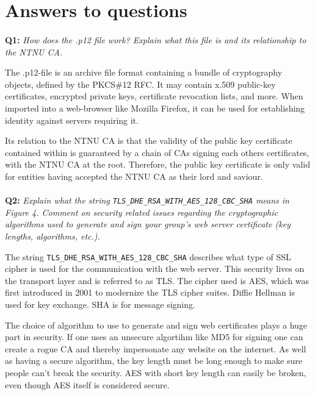 \section{Answers to questions}

\paragraph{}
\textbf{Q1:}
\textit{How does the .p12 file work? Explain what this file is and its relationship to the NTNU CA.}

The .p12-file is an archive file format containing a bundle of cryptography objects, defined by the PKCS\#12 RFC\cite{pkcs-12}.
It may contain x.509 public-key certificates\cite{x509}, encrypted private keys, certificate revocation lists, and more.
When imported into a web-browser like Mozilla Firefox, it can be used for establishing identity against servers requiring it.

Its relation to the NTNU CA is that the validity of the public key certificate contained within is guaranteed by a chain of CAs signing each others certificates, with the NTNU CA at the root.
Therefore, the public key certificate is only valid for entities having accepted the NTNU CA as their lord and saviour.

\paragraph{}
\textbf{Q2:}
\cprotect\textit{Explain what the string \verb/TLS_DHE_RSA_WITH_AES_128_CBC_SHA/ means in Figure 4. Comment on security related issues regarding the cryptographic algorithms used to generate and sign your group's web server certificate (key lengths, algorithms, etc.).}

The string \verb/TLS_DHE_RSA_WITH_AES_128_CBC_SHA/ describes what type of SSL cipher is used for the communication with the web server.
This security lives on the transport layer and is referred to as TLS.
The cipher used is AES, which was first introduced in 2001\cite{rfc3268} to modernize the TLS cipher suites.
Diffie Hellman is used for key exchange.
SHA is for message signing.

The choice of algorithm to use to generate and sign web certificates plays a huge part in security.
If one uses an unsecure algortihm like MD5 for signing one can create a rogue CA and thereby impersonate any website on the internet\cite{md5-harmful}.
As well as having a secure algorithm, the key length must be long enough to make sure people can't break the security.
AES with short key length can easily be broken, even though AES itself is considered secure\cite{nsa-secure}.

